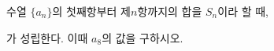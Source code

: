 \hspace*{2mm}\begin{minipage}[t]{\dimexpr\linewidth-2mm\relax}\vspace{0pt}
수열 $\{a_n\}$의 첫째항부터 제$n$항까지의 합을 $S_n$이라 할 때, \par\smallskip{}\par\smallskip\noindent 가 성립한다. 이때 $a_8$의 값을 구하시오.\end{minipage}
